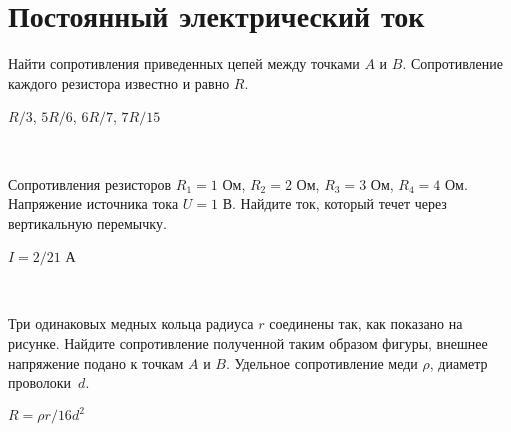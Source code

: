 \section{Постоянный электрический ток}

\begin{ex}
Найти сопротивления приведенных цепей между точками $A$ и $B$. Сопротивление каждого резистора известно и равно $R$.
\begin{center}




\end{center}
\begin{ans}
$R/3$, $5R/6$, $6R/7$, $7R/15$
\end{ans}
\end{ex}

\begin{ex}
\hspace{0pt} \\
\begin{minipage}{.65\textwidth}
Сопротивления резисторов $R_1 = 1$ Ом, $R_2 = 2$ Ом, $R_3 = 3$ Ом, $R_4 =4$ Ом. 
Напряжение источника тока $U = 1$ В. Найдите ток, который течет через вертикальную перемычку.
\end{minipage}
\begin{minipage}{.35\textwidth}
\centering

\end{minipage}
\begin{ans}
$I = 2/21$ А
\end{ans}
\end{ex}

\begin{ex}
\hspace{0pt} \\
\begin{minipage}{.65\textwidth}
Три одинаковых медных кольца радиуса $r$ соединены так, как показано на рисунке. 
Найдите сопротивление полученной таким образом фигуры, внешнее напряжение подано к точкам $A$ и $B$. 
Удельное сопротивление меди $\rho$, диаметр проволоки~$d$.
\end{minipage}
\begin{minipage}{.35\textwidth}
\centering

\end{minipage}
\begin{ans}
$R = \rho r /16d^2$
\end{ans}
\end{ex}

